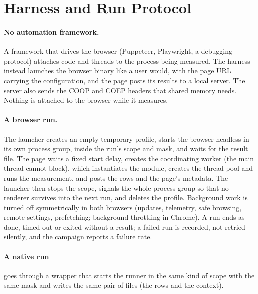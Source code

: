 \section{Harness and Run Protocol}
\label{sec:harness}

\paragraph{No automation framework.} A framework that drives the browser
(Puppeteer, Playwright, a debugging protocol) attaches code and threads to
the process being measured. The harness instead launches the browser binary
like a user would, with the page URL carrying the configuration, and the
page posts its results to a local server. The server also sends the COOP
and COEP headers that shared memory needs. Nothing is attached to the
browser while it measures.

\paragraph{A browser run.} The launcher creates an empty temporary profile,
starts the browser headless in its own process group, inside the run's
scope and mask, and waits for the result file. The page waits a fixed start
delay, creates the coordinating worker (the main thread cannot block),
which instantiates the module, creates the thread pool and runs the
measurement, and posts the rows and the page's metadata. The launcher then
stops the scope, signals the whole process group so that no renderer
survives into the next run, and deletes the profile. Background work is
turned off symmetrically in both browsers (updates, telemetry, safe
browsing, remote settings, prefetching; background throttling in Chrome).
A run ends as done, timed out or exited without a result; a failed run is
recorded, not retried silently, and the campaign reports a failure rate.

\paragraph{A native run} goes through a wrapper that starts the runner in
the same kind of scope with the same mask and writes the same pair of files
(the rows and the context).

